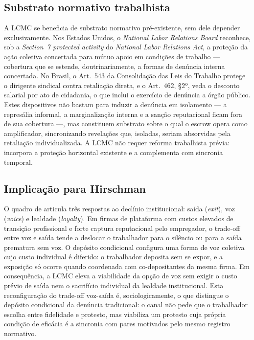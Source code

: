 \documentclass[12pt,a4paper]{article}
\begin{document}
\subsection{Substrato normativo trabalhista}

A LCMC se beneficia de substrato normativo pré-existente, sem dele depender
exclusivamente. Nos Estados Unidos, o \emph{National Labor Relations Board}
reconhece, sob a \emph{Section~7 protected activity} do \emph{National Labor
Relations Act}, a proteção da ação coletiva concertada para mútuo apoio em
condições de trabalho --- cobertura que se estende, doutrinariamente, a formas
de denúncia interna concertada. No Brasil, o Art.~543 da Consolidação das Leis
do Trabalho protege o dirigente sindical contra retaliação direta, e o Art.~462,
\S2º, veda o desconto salarial por ato de cidadania, o que inclui o exercício de
denúncia a órgão público. Estes dispositivos não bastam para induzir a denúncia
em isolamento --- a represália informal, a marginalização interna e a sanção
reputacional ficam fora de sua cobertura ---, mas constituem substrato sobre o
qual o escrow opera como amplificador, sincronizando revelações que, isoladas,
seriam absorvidas pela retaliação individualizada. A LCMC não requer reforma
trabalhista prévia: incorpora a proteção horizontal existente e a complementa
com sincronia temporal.

\subsection{Implicação para Hirschman}

O quadro de \citet{hirschman1970exit} articula três respostas ao declínio
institucional: saída (\emph{exit}), voz (\emph{voice}) e lealdade
(\emph{loyalty}). Em firmas de plataforma com custos elevados de transição
profissional e forte captura reputacional pelo empregador, o trade-off entre
voz e saída tende a deslocar o trabalhador para o silêncio ou para a saída
prematura sem voz. O depósito condicional configura uma forma de voz coletiva
cujo custo individual é diferido: o trabalhador deposita sem se expor, e a
exposição só ocorre quando coordenada com co-depositantes da mesma firma. Em
consequência, a LCMC eleva a viabilidade da opção de voz sem exigir o custo
prévio de saída nem o sacrifício individual da lealdade institucional. Esta
reconfiguração do trade-off voz-saída é, sociologicamente, o que distingue o
depósito condicional da denúncia tradicional: o canal não pede que o trabalhador
escolha entre fidelidade e protesto, mas viabiliza um protesto cuja própria
condição de eficácia é a sincronia com pares motivados pelo mesmo registro
normativo.
\end{document}
